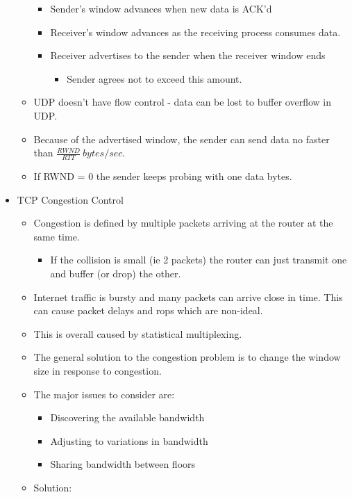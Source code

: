 \begin{itemize}
\begin{itemize}
    \begin{itemize}
    \tightlist
    \item
      Sender's window advances when new data is ACK'd
    \item
      Receiver's window advances as the receiving process consumes data.
    \item
      Receiver advertises to the sender when the receiver window ends

      \begin{itemize}
      \tightlist
      \item
        Sender agrees not to exceed this amount.
      \end{itemize}
    \end{itemize}
  \item
    UDP doesn't have flow control - data can be lost to buffer overflow
    in UDP.
  \item
    Because of the advertised window, the sender can send data no faster
    than \(\frac{RWND}{RTT}\ bytes/sec\).
  \item
    If RWND = 0 the sender keeps probing with one data bytes.
  \end{itemize}
\item
  TCP Congestion Control

  \begin{itemize}
  \tightlist
  \item
    Congestion is defined by multiple packets arriving at the router at
    the same time.

    \begin{itemize}
    \tightlist
    \item
      If the collision is small (ie 2 packets) the router can just
      transmit one and buffer (or drop) the other.
    \end{itemize}
  \item
    Internet traffic is bursty and many packets can arrive close in
    time. This can cause packet delays and rops which are non-ideal.
  \item
    This is overall caused by statistical multiplexing.
  \item
    The general solution to the congestion problem is to change the
    window size in response to congestion.
  \item
    The major issues to consider are:

    \begin{itemize}
    \tightlist
    \item
      Discovering the available bandwidth
    \item
      Adjusting to variations in bandwidth
    \item
      Sharing bandwidth between floors
    \end{itemize}
  \item
    Solution:


\end{itemize}
\end{itemize}
